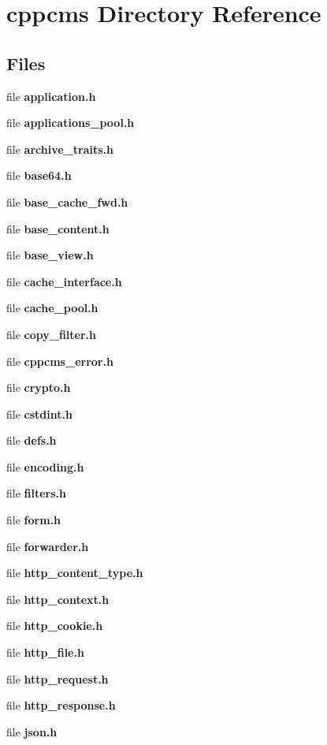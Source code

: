 \section{cppcms Directory Reference}
\label{dir_8c18e70309cc9e297cbe678abc284b34}
\subsection*{Files}
\begin{DoxyCompactItemize}
\item 
file {\bfseries application.\-h}
\item 
file {\bfseries applications\-\_\-pool.\-h}
\item 
file {\bfseries archive\-\_\-traits.\-h}
\item 
file {\bfseries base64.\-h}
\item 
file {\bfseries base\-\_\-cache\-\_\-fwd.\-h}
\item 
file {\bfseries base\-\_\-content.\-h}
\item 
file {\bfseries base\-\_\-view.\-h}
\item 
file {\bfseries cache\-\_\-interface.\-h}
\item 
file {\bfseries cache\-\_\-pool.\-h}
\item 
file {\bfseries copy\-\_\-filter.\-h}
\item 
file {\bfseries cppcms\-\_\-error.\-h}
\item 
file {\bfseries crypto.\-h}
\item 
file {\bfseries cstdint.\-h}
\item 
file {\bfseries defs.\-h}
\item 
file {\bfseries encoding.\-h}
\item 
file {\bfseries filters.\-h}
\item 
file {\bfseries form.\-h}
\item 
file {\bfseries forwarder.\-h}
\item 
file {\bfseries http\-\_\-content\-\_\-type.\-h}
\item 
file {\bfseries http\-\_\-context.\-h}
\item 
file {\bfseries http\-\_\-cookie.\-h}
\item 
file {\bfseries http\-\_\-file.\-h}
\item 
file {\bfseries http\-\_\-request.\-h}
\item 
file {\bfseries http\-\_\-response.\-h}
\item 
file {\bfseries json.\-h}

\end{DoxyCompactItemize}
